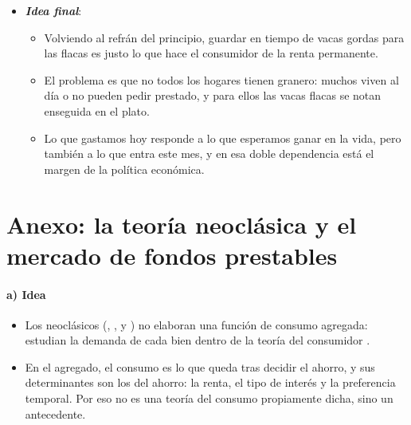 \documentclass[11pt]{article}
\begin{document}
\begin{itemize}
\begin{itemize}
  \item Para la política económica, la pregunta útil ya no es cuál es «la» propensión a consumir, sino cómo se reparte entre los hogares: la misma medida tiene efectos muy distintos según a quién llegue.
  \end{itemize}
\item \textbf{\emph{Idea final}}:
  \begin{itemize}
  \item Volviendo al refrán del principio, guardar en tiempo de vacas gordas para las flacas es justo lo que hace el consumidor de la renta permanente.

  \item El problema es que no todos los hogares tienen granero: muchos viven al día o no pueden pedir prestado, y para ellos las vacas flacas se notan enseguida en el plato.

  \item Lo que gastamos hoy responde a lo que esperamos ganar en la vida, pero también a lo que entra este mes, y en esa doble dependencia está el margen de la política económica.
  \end{itemize}
\end{itemize}

\clearpage
\appendix

\section{Anexo: la teoría neoclásica y el mercado de fondos prestables}\label{anexo:neoclasica}

\paragraph{a) Idea}

\begin{itemize}
\item Los neoclásicos (, ,  y ) no elaboran una función de consumo agregada: estudian la demanda de cada bien dentro de la teoría del consumidor .
\item En el agregado, el consumo es lo que queda tras decidir el ahorro, y sus determinantes son los del ahorro: la renta, el tipo de interés y la preferencia temporal. Por eso no es una teoría del consumo propiamente dicha, sino un antecedente.
\end{itemize}
\end{document}

